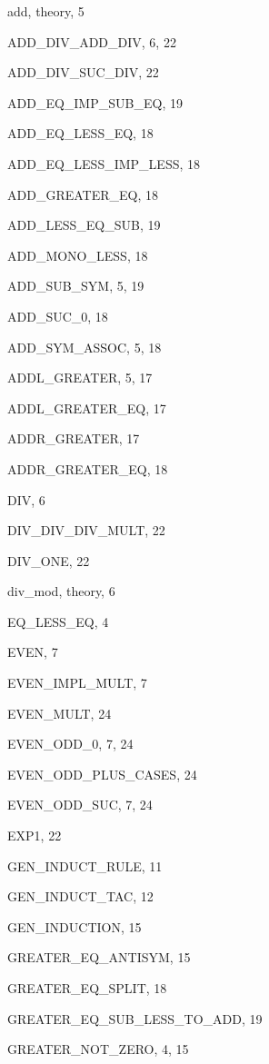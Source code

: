 \begin{theindex}

  \item {\ptt add}, theory, 5
  \item {\ptt ADD\_DIV\_ADD\_DIV}, 6, 22
  \item {\ptt ADD\_DIV\_SUC\_DIV}, 22
  \item {\ptt ADD\_EQ\_IMP\_SUB\_EQ}, 19
  \item {\ptt ADD\_EQ\_LESS\_EQ}, 18
  \item {\ptt ADD\_EQ\_LESS\_IMP\_LESS}, 18
  \item {\ptt ADD\_GREATER\_EQ}, 18
  \item {\ptt ADD\_LESS\_EQ\_SUB}, 19
  \item {\ptt ADD\_MONO\_LESS}, 18
  \item {\ptt ADD\_SUB\_SYM}, 5, 19
  \item {\ptt ADD\_SUC\_0}, 18
  \item {\ptt ADD\_SYM\_ASSOC}, 5, 18
  \item {\ptt ADDL\_GREATER}, 5, 17
  \item {\ptt ADDL\_GREATER\_EQ}, 17
  \item {\ptt ADDR\_GREATER}, 17
  \item {\ptt ADDR\_GREATER\_EQ}, 18

  \indexspace

  \item {\ptt DIV}, 6
  \item {\ptt DIV\_DIV\_DIV\_MULT}, 22
  \item {\ptt DIV\_ONE}, 22
  \item {\ptt div\_mod}, theory, 6

  \indexspace

  \item {\ptt EQ\_LESS\_EQ}, 4
  \item {\ptt EVEN}, 7
  \item {\ptt EVEN\_IMPL\_MULT}, 7
  \item {\ptt EVEN\_MULT}, 24
  \item {\ptt EVEN\_ODD\_0}, 7, 24
  \item {\ptt EVEN\_ODD\_PLUS\_CASES}, 24
  \item {\ptt EVEN\_ODD\_SUC}, 7, 24
  \item {\ptt EXP1}, 22

  \indexspace

  \item {\ptt GEN\_INDUCT\_RULE}, 11
  \item {\ptt GEN\_INDUCT\_TAC}, 12
  \item {\ptt GEN\_INDUCTION}, 15
  \item {\ptt GREATER\_EQ\_ANTISYM}, 15
  \item {\ptt GREATER\_EQ\_SPLIT}, 18
  \item {\ptt GREATER\_EQ\_SUB\_LESS\_TO\_ADD}, 19
  \item {\ptt GREATER\_NOT\_ZERO}, 4, 15


\end{theindex}
